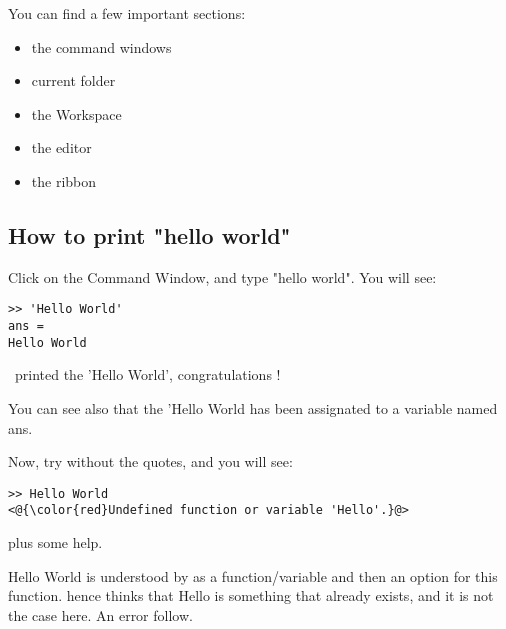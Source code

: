 You can find a few important sections:
\begin{itemize}
	\item the command windows \\
	\item current folder \\
	\item the Workspace \\
	\item the editor \\
	\item the ribbon \\
\end{itemize}


\subsection{How to print "hello world"}

Click on the Command Window, and type "hello world".
You will see:

\begin{lstlisting}
>> 'Hello World'
ans =
Hello World
\end{lstlisting}

\medskip

\matlab~printed the 'Hello World', congratulations !

You can see also that the 'Hello World has been assignated to a variable named ans.



Now, try without the quotes, and you will see:
\begin{lstlisting}
>> Hello World
<@{\color{red}Undefined function or variable 'Hello'.}@>
\end{lstlisting}
plus some help.

Hello World is understood by \matlab as a function/variable and then an option for this function.
\matlab hence thinks that Hello is something that already exists, and it is not the case here. An error follow.

